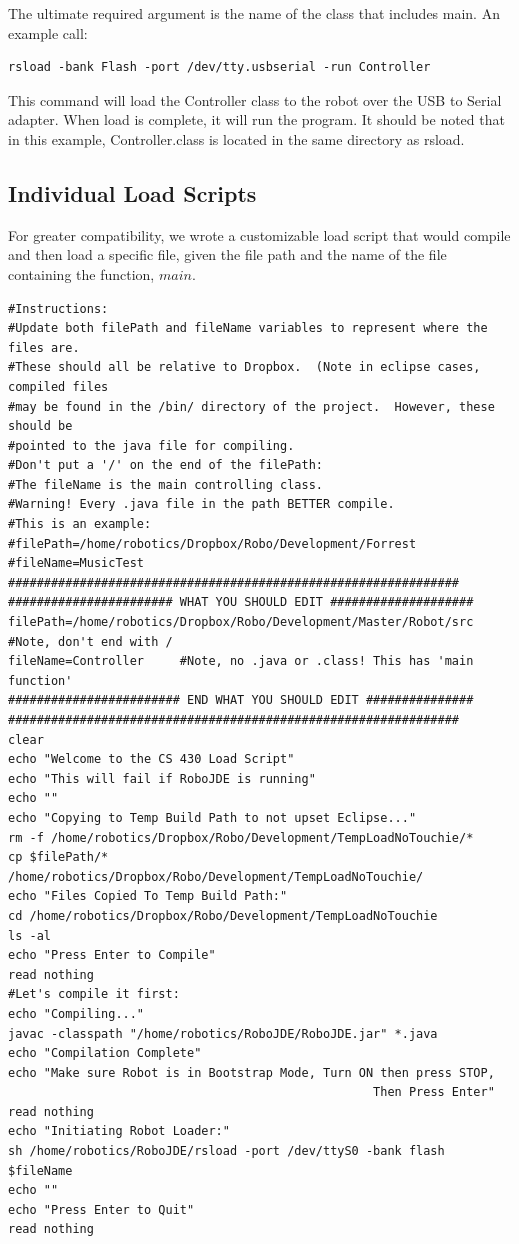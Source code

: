 \documentclass[12pt]{article}
\begin{document}
The ultimate required argument is the name of the class that includes main.  An example call:
\begin{verbatim}
rsload -bank Flash -port /dev/tty.usbserial -run Controller
\end{verbatim}
This command will load the Controller class to the robot over the USB to Serial adapter.  When load is complete, it will run the program.  It should be noted that in this example, Controller.class is located in the same directory as rsload.

\subsection{Individual Load Scripts}
For greater compatibility, we wrote a customizable load script that would compile and then load a specific file, given the file path and the name of the file containing the function, $main$.
\small{\begin{verbatim}
#Instructions:
#Update both filePath and fileName variables to represent where the files are.
#These should all be relative to Dropbox.  (Note in eclipse cases, compiled files 
#may be found in the /bin/ directory of the project.  However, these should be 
#pointed to the java file for compiling.
#Don't put a '/' on the end of the filePath:
#The fileName is the main controlling class.
#Warning! Every .java file in the path BETTER compile.
#This is an example:
#filePath=/home/robotics/Dropbox/Robo/Development/Forrest
#fileName=MusicTest
###############################################################
####################### WHAT YOU SHOULD EDIT ####################
filePath=/home/robotics/Dropbox/Robo/Development/Master/Robot/src 
#Note, don't end with /
fileName=Controller		#Note, no .java or .class! This has 'main function'
######################## END WHAT YOU SHOULD EDIT ###############
###############################################################
clear
echo "Welcome to the CS 430 Load Script"
echo "This will fail if RoboJDE is running"
echo ""
echo "Copying to Temp Build Path to not upset Eclipse..."
rm -f /home/robotics/Dropbox/Robo/Development/TempLoadNoTouchie/*
cp $filePath/* /home/robotics/Dropbox/Robo/Development/TempLoadNoTouchie/
echo "Files Copied To Temp Build Path:"
cd /home/robotics/Dropbox/Robo/Development/TempLoadNoTouchie
ls -al
echo "Press Enter to Compile"
read nothing
#Let's compile it first:
echo "Compiling..."
javac -classpath "/home/robotics/RoboJDE/RoboJDE.jar" *.java
echo "Compilation Complete"
echo "Make sure Robot is in Bootstrap Mode, Turn ON then press STOP, 
                                                   Then Press Enter"
read nothing
echo "Initiating Robot Loader:"
sh /home/robotics/RoboJDE/rsload -port /dev/ttyS0 -bank flash $fileName
echo ""
echo "Press Enter to Quit"
read nothing
\end{verbatim}}
\end{document}
